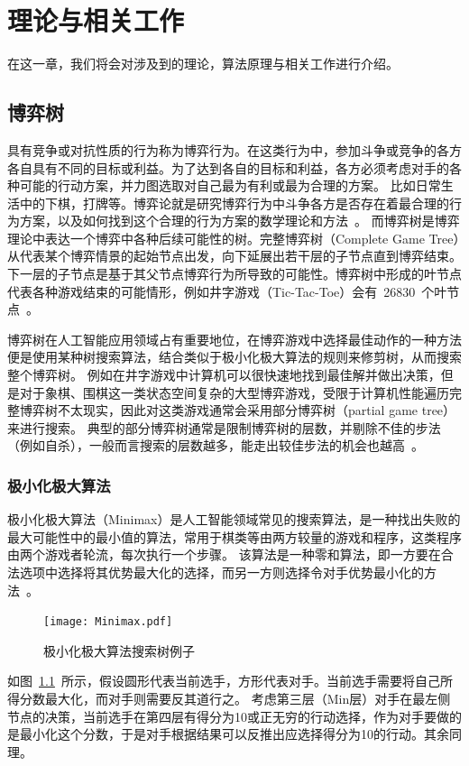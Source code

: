 \chapter{理论与相关工作}
\label{chap:theory}
在这一章，我们将会对涉及到的理论，算法原理与相关工作进行介绍。
\section{博弈树}
具有竞争或对抗性质的行为称为博弈行为。在这类行为中，参加斗争或竞争的各方各自具有不同的目标或利益。为了达到各自的目标和利益，各方必须考虑对手的各种可能的行动方案，并力图选取对自己最为有利或最为合理的方案。
比如日常生活中的下棋，打牌等。博弈论就是研究博弈行为中斗争各方是否存在着最合理的行为方案，以及如何找到这个合理的行为方案的数学理论和方法~\cite{gt}。
而博弈树是博弈理论中表达一个博弈中各种后续可能性的树。完整博弈树（Complete Game Tree）从代表某个博弈情景的起始节点出发，向下延展出若干层的子节点直到博弈结束。
下一层的子节点是基于其父节点博弈行为所导致的可能性。博弈树中形成的叶节点代表各种游戏结束的可能情形，例如井字游戏（Tic-Tac-Toe）会有~26830~个叶节点~\cite{NAU1982257,allis1994searching}。


博弈树在人工智能应用领域占有重要地位，在博弈游戏中选择最佳动作的一种方法便是使用某种树搜索算法，结合类似于极小化极大算法的规则来修剪树，从而搜索整个博弈树。
例如在井字游戏中计算机可以很快速地找到最佳解并做出决策，但是对于象棋、围棋这一类状态空间复杂的大型博弈游戏，受限于计算机性能遍历完整博弈树不太现实，因此对这类游戏通常会采用部分博弈树（partial game tree）来进行搜索。
典型的部分博弈树通常是限制博弈树的层数，并剔除不佳的步法（例如自杀），一般而言搜索的层数越多，能走出较佳步法的机会也越高~\cite{coin12162}。

\subsection{极小化极大算法}
极小化极大算法（Minimax）是人工智能领域常见的搜索算法，是一种找出失败的最大可能性中的最小值的算法，常用于棋类等由两方较量的游戏和程序，这类程序由两个游戏者轮流，每次执行一个步骤。
该算法是一种零和算法，即一方要在合法选项中选择将其优势最大化的选择，而另一方则选择令对手优势最小化的方法~\cite{ctt1r2gkx}。

\begin{figure}[htb]
    \centering
    \texttt{[image: Minimax.pdf]}
    \caption[minimax]{%
      极小化极大算法搜索树例子~\cite{wikiMinimax}%
      }
    \label{fig:minimax}
  \end{figure}

如图~\ref{fig:minimax}~所示，假设圆形代表当前选手，方形代表对手。当前选手需要将自己所得分数最大化，而对手则需要反其道行之。
考虑第三层（Min层）对手在最左侧节点的决策，当前选手在第四层有得分为10或正无穷的行动选择，作为对手要做的是最小化这个分数，于是对手根据结果可以反推出应选择得分为10的行动。其余同理。
